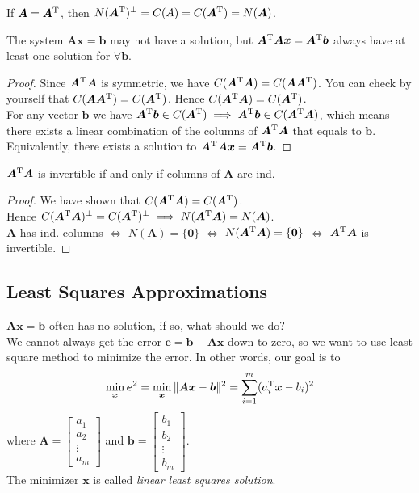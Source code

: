 \begin{remark}
\begin{corollary}
If $\bm A=\bm A^{\mathrm T}$, then $N(\bm A^{\mathrm T})^{\perp}=C(A)=C(\bm A^{\mathrm T})=N(\bm A)$.
\end{corollary}
\begin{corollary}\label{corollary_12.5}
The system $\bm{Ax}=\bm b$ may not have a solution, but $\bm A^{\mathrm T}\bm A\bm x=\bm A^{\mathrm T}\bm b$ always have at least one solution for $\forall\bm b$.
\end{corollary}
\begin{proof}
Since $\bm A^{\mathrm T}\bm A$ is symmetric, we have $C(\bm A^{\mathrm T}\bm A)=C(\bm A\bm A^{\mathrm T})$. You can check by yourself that $C(\bm A\bm A^{\mathrm T})=C(\bm A^{\mathrm T})$.
Hence $C(\bm A^{\mathrm T}\bm A)=C(\bm A^{\mathrm T})$.\\
For any vector $\bm b$ we have $\bm A^{\mathrm T}\bm b\in C(\bm A^{\mathrm T})\implies\bm A^{\mathrm T}\bm b\in C(\bm A^{\mathrm T}\bm A)$, which means there exists a linear combination of the columns of $\bm A^{\mathrm T}\bm A$ that equals to $\bm b$.\\
Equivalently, there exists a solution to $\bm A^{\mathrm T}\bm A\bm x=\bm A^{\mathrm T}\bm b$.
\end{proof}
\begin{corollary}\label{corollary_12.6}
$\bm A^{\mathrm T}\bm A$ is invertible if and only if columns of $\bm A$ are ind.
\end{corollary}
\begin{proof}
We have shown that $C(\bm A^{\mathrm T}\bm A)=C(\bm A^{\mathrm T})$.\\ Hence $C(\bm A^{\mathrm T}\bm A)^{\perp}=C(\bm A^{\mathrm T})^{\perp}\implies N(\bm A^{\mathrm T}\bm A)=N(\bm A)$.\\
$\bm A$ has ind. columns
$\Longleftrightarrow$
$N(\bm A)=\{\bm 0\}$
$\Longleftrightarrow$
$N(\bm A^{\mathrm T}\bm A)=\{\bm 0\}$
$\Longleftrightarrow$
$\bm A^{\mathrm T}\bm A$ is invertible.
\end{proof}
\end{remark}
\subsection{Least Squares Approximations}
$\bm{Ax}=\bm b$ often has no solution, if so, what should we do?\\
We cannot always get the error $\bm e=\bm b-\bm{Ax}$ down to zero, so we want to use least square method to minimize the error. In other words, our goal is to
\[
\min_{\bm x}\bm e^2=\min_{\bm x}\|\bm{Ax}-\bm b\|^2=\sum_{i=1}^{m}(a_i^{\mathrm T}\bm x-b_i)^2
\]
where $\bm A=\begin{bmatrix}
a_1\\a_2\\\vdots\\a_m
\end{bmatrix}$ and $\bm b=\begin{bmatrix}
b_1\\b_2\\\vdots\\b_m
\end{bmatrix}$.\\
The minimizer $\bm x$ is called \emph{linear least squares solution}.
